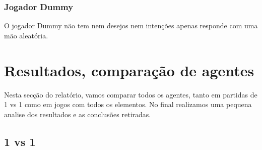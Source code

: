\documentclass[12pt]{article}
\begin{document}
	
	\subsubsection*{Jogador Dummy}
	O jogador Dummy não tem nem desejos nem intenções apenas responde com uma mão aleatória.\\
	
	
	\section*{Resultados, comparação de agentes}
    Nesta secção do relatório, vamos comparar todos os agentes, tanto em partidas de 1 vs 1 como em jogos com todos os elementos. No final realizamos uma pequena analise dos resultados e as conclusões retiradas.\\
	
	\subsection*{1 vs 1}
	
\end{document}
